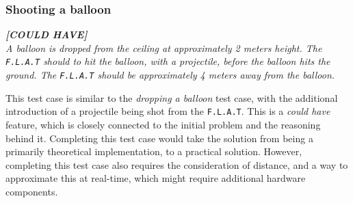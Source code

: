 \subsubsection{Shooting a balloon}
\textit{\textbf{[COULD HAVE]}}\\
\textit{A balloon is dropped from the ceiling at approximately 2 meters height.
The \texttt{F.L.A.T} should to hit the balloon, with a projectile, before the balloon hits the ground.
The \texttt{F.L.A.T} should be approximately 4 meters away from the balloon.}

This test case is similar to the \textit{dropping a balloon} test case, with the additional introduction of a projectile being shot from the \texttt{F.L.A.T}.
This is a \textit{could have} feature, which is closely connected to the initial problem and the reasoning behind it.
Completing this test case would take the solution from being a primarily theoretical implementation, to a practical solution.
However, completing this test case also requires the consideration of distance, and a way to approximate this at real-time, which might require additional hardware components.

